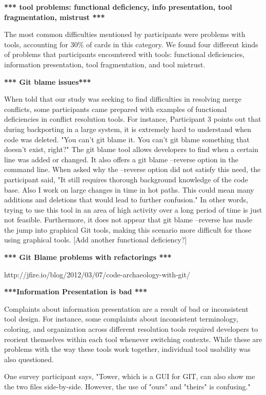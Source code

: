 \documentclass[conference]{IEEEtran}
\begin{document}
\textbf{*** tool problems: functional deficiency, info presentation, tool fragmentation,  mistrust ***}

The most common difficulties mentioned by participants were problems with tools, accounting for 30\% of cards in this category. We found four different kinds of problems that participants encountered with tools: functional deficiencies, information presentation, tool fragmentation, and tool mistrust. 

\textbf{*** Git blame issues***}

When told that our study was seeking to find difficulties in resolving merge conflicts, some participants came prepared with examples of functional deficiencies in conflict resolution tools. For instance, Participant 3 points out that during backporting in a large system, it is extremely hard to understand when code was deleted. "You can't git blame it. You can't git blame something that doesn't exist, right?" 
The git blame tool allows developers to find when a certain line was added or changed. It also offers a git blame --reverse option in the command line. When asked why the --reverse option did not satisfy this need, the participant said, "It still requires thorough background knowledge of the code base. Also I work on large changes in time in hot paths. This could mean many additions and deletions that would lead to further confusion." In other words, trying to use this tool in an area of high activity over a long period of time is just not feasible. Furthermore, it does not appear that git blame --reverse has made the jump into graphical Git tools, making this scenario more difficult for those using graphical tools. [Add another functional deficiency?]

\textbf{*** Git Blame problems with refactorings ***}

http://jfire.io/blog/2012/03/07/code-archaeology-with-git/

\textbf{***Information Presentation is bad ***}

Complaints about information presentation are a result of bad or inconsistent tool design. For instance, some complaints about inconsistent terminology, coloring, and organization across different resolution tools required developers to reorient themselves within each tool whenever switching contexts. While these are problems with the way these tools work together, individual tool usability was also questioned.

One survey participant says, "Tower, which is a GUI for GIT, can also show me the two files side-by-side. However, the use of "ours" and "theirs" is confusing."
\end{document}
